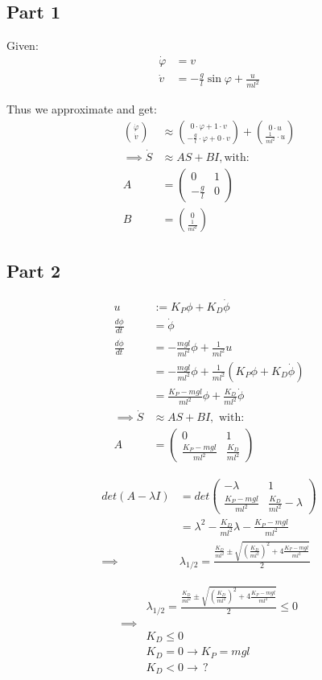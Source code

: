 \documentclass[a4paper,parskip,headheight=38pt]{scrartcl} %
\begin{document}
\subsection*{Part 1}

Given:
\begin{align*}
    \dot{\varphi} &= v \\
    \dot{v} &= - \frac{g}{l} \sin \varphi + \frac{u}{ml^2}
\end{align*}

Thus we approximate and get:
\begin{align*}
    \binom{\dot{\varphi}}{\dot{v}} &\approx \binom{0 \cdot \varphi + 1 \cdot v}{- \frac{g}{l} \cdot \varphi + 0 \cdot v} + \binom{0 \cdot u}{\frac{1}{ml^2} \cdot u} \\
    \implies \dot{S} &\approx AS + BI, \text{with:} \\
    A &= \left( \begin{array}{cc} 0 & 1 \\ -\frac{g}{l} & 0 \end{array} \right) \\
    B &= \binom{0}{\frac{1}{ml^2}}
\end{align*}

\subsection*{Part 2}
\begin{align*}
	u &:= K_P \phi + K_D \dot{\phi} \\
	\frac{d \phi}{d t} &= \dot{\phi} \\
	\frac{d \dot{\phi}}{d t} &= - \frac{mgl}{ml^2} \phi + \frac{1}{ml^2}u \\
	&= - \frac{mgl}{ml^2} \phi + \frac{1}{ml^2} (K_P \phi + K_D \dot{\phi}) \\
	&= \frac{K_P-mgl}{ml^2}\phi + \frac{K_D}{ml^2}\dot{\phi} \\
	\implies \dot{S} &\approx AS + BI, \text{ with:} \\
    A &= \left( \begin{array}{cc} 0 & 1 \\ \frac{K_P-mgl}{ml^2} & \frac{K_D}{ml^2} \end{array} \right)
\end{align*}

\begin{align*}
det(A - \lambda I) &=  det\left( \begin{array}{cc} -\lambda & 1 \\ \frac{K_P-mgl}{ml^2} & \frac{K_D}{ml^2} - \lambda \end{array} \right) \\
 &= \lambda ^ 2 - \frac{K_D}{ml^2}\lambda - \frac{K_P - mgl}{ml^2} \\
\implies & \lambda_{1/2} = \frac{\frac{K_D}{ml^2} \pm \sqrt{\left(\frac{K_D}{ml^2}\right)^2 + 4\frac{K_P - mgl}{ml^2}}}{2}
\end{align*}

\begin{align*}
& \lambda_{1/2} = \frac{\frac{K_D}{ml^2} \pm \sqrt{\left(\frac{K_D}{ml^2}\right)^2 + 4\frac{K_P - mgl}{ml^2}}}{2} \leq 0 \\
\implies & \\
& K_D \leq 0  \\
& K_D = 0 \rightarrow K_P = mgl \\
& K_D < 0 \rightarrow \, ?
\end{align*}
\end{document}
